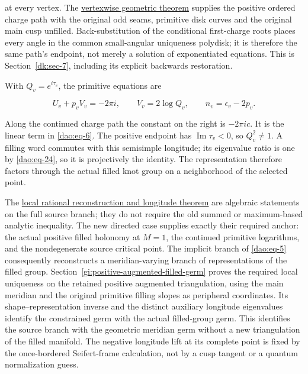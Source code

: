 at every vertex. The \href{https://sashakolpakov.github.io/murakamis_dream/notes/actual_all_circle_vertexwise_geometry.html}{vertexwise geometric theorem} supplies the positive ordered charge path with the original odd seams, primitive disk curves and the original main cusp unfilled. Back-substitution of the conditional first-charge roots places every angle in the common small-angular uniqueness polydisk; it is therefore the same path's endpoint, not merely a solution of exponentiated equations. This is Section~\ref{dk:sec-7}, including its explicit backwards restoration.

With \(Q_v=e^{i\tau_v}\), the primitive equations are

\begin{equation}\label{dao:eq-24}
U_v+p_vV_v=-2\pi i,\qquad V_v=2\log Q_v,
 \qquad n_v=\epsilon_v-2p_v.
\end{equation}

Along the continued charge path the constant on the right is \(-2\pi ic\). It is the linear term in \eqref{dao:eq-6}. The positive endpoint has \(\operatorname{Im}\tau_v<0\), so \(Q_v^2\ne1\). A filling word commutes with this semisimple longitude; its eigenvalue ratio is one by \eqref{dao:eq-24}, so it is projectively the identity. The representation therefore factors through the actual filled knot group on a neighborhood of the selected point.

The \href{https://sashakolpakov.github.io/murakamis_dream/notes/actual_all_circle_geometric_characteristic.html}{local rational reconstruction and longitude theorem} are algebraic statements on the full source branch; they do not require the old summed or maximum-based analytic inequality. The new directed case supplies exactly their required anchor: the actual positive filled holonomy at \(M=1\), the continued primitive logarithms, and the nondegenerate source critical point. The implicit branch of \eqref{dao:eq-5} consequently reconstructs a meridian-varying branch of representations of the filled group. Section~\ref{gi:positive-augmented-filled-germ} proves the required local uniqueness on the retained positive augmented triangulation, using the main meridian and the original primitive filling slopes as peripheral coordinates. Its shape--representation inverse and the distinct auxiliary longitude eigenvalues identify the constrained germ with the actual filled-group germ. This identifies the source branch with the geometric meridian germ without a new triangulation of the filled manifold. The negative longitude lift at its complete point is fixed by the once-bordered Seifert-frame calculation, not by a cusp tangent or a quantum normalization guess.

